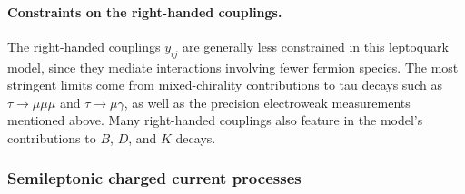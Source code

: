\paragraph{Constraints on the right-handed couplings.} The right-handed
couplings $y_{ij}$ are generally less constrained in this leptoquark model,
since they mediate interactions involving fewer fermion species. The most
stringent limits come from mixed-chirality contributions to tau decays such as
$\tau \to \mu \mu \mu$ and $\tau \to \mu \gamma$, as well as the precision
electroweak measurements mentioned above. Many right-handed couplings also
feature in the model's contributions to $B$, $D$, and $K$ decays.

\subsubsection{Semileptonic charged current processes}
\label{sec:ch3-semileptonicchargedcurrentprocesses}

